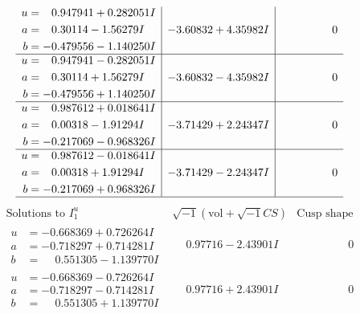 \documentclass[1p]{elsarticle_modified}
\theoremstyle{definition}
\newcommand{\I}{\sqrt{-1}}
\begin{document}
$$\begin{array}{c|c|c}
\begin{aligned}
u &= \phantom{-}0.947941 + 0.282051 I \\
a &= \phantom{-}0.30114 - 1.56279 I \\
b &= -0.479556 - 1.140250 I\end{aligned}
 & -3.60832 + 4.35982 I & \phantom{-0.000000 } 0 \\ \hline\begin{aligned}
u &= \phantom{-}0.947941 - 0.282051 I \\
a &= \phantom{-}0.30114 + 1.56279 I \\
b &= -0.479556 + 1.140250 I\end{aligned}
 & -3.60832 - 4.35982 I & \phantom{-0.000000 } 0 \\ \hline\begin{aligned}
u &= \phantom{-}0.987612 + 0.018641 I \\
a &= \phantom{-}0.00318 - 1.91294 I \\
b &= -0.217069 - 0.968326 I\end{aligned}
 & -3.71429 + 2.24347 I & \phantom{-0.000000 } 0 \\ \hline\begin{aligned}
u &= \phantom{-}0.987612 - 0.018641 I \\
a &= \phantom{-}0.00318 + 1.91294 I \\
b &= -0.217069 + 0.968326 I\end{aligned}
 & -3.71429 - 2.24347 I & \phantom{-0.000000 } 0\\
 \hline 
 \end{array}$$\newpage$$\begin{array}{c|c|c}  
\text{Solutions to }I^u_{1}& \I (\text{vol} + \sqrt{-1}CS) & \text{Cusp shape}\\
 \hline 
\begin{aligned}
u &= -0.668369 + 0.726264 I \\
a &= -0.718297 + 0.714281 I \\
b &= \phantom{-}0.551305 - 1.139770 I\end{aligned}
 & \phantom{-}0.97716 - 2.43901 I & \phantom{-0.000000 } 0 \\ \hline\begin{aligned}
u &= -0.668369 - 0.726264 I \\
a &= -0.718297 - 0.714281 I \\
b &= \phantom{-}0.551305 + 1.139770 I\end{aligned}
 & \phantom{-}0.97716 + 2.43901 I & \phantom{-0.000000 } 0 \\ \hline\begin{aligned}

\end{aligned}
\end{array}$$
\end{document}
